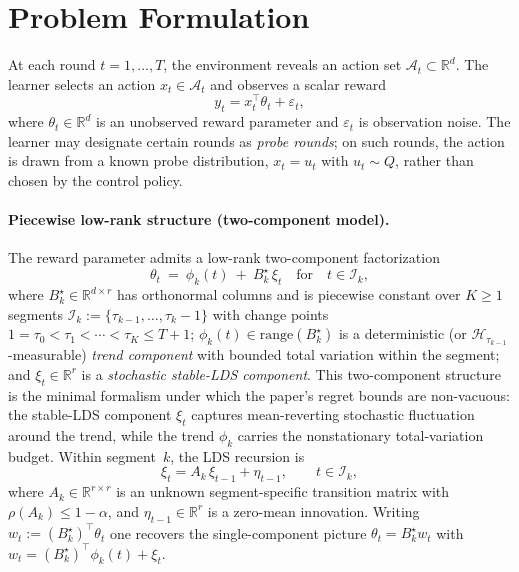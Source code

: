 \documentclass[11pt]{article}
\newcommand{\R}{\mathbb{R}}
\newcommand{\cA}{\mathcal{A}}
\newcommand{\cH}{\mathcal{H}}
\newcommand{\cI}{\mathcal{I}}
\newcommand{\range}{\mathrm{range}}
\begin{document}
\section{Problem Formulation}
\label{sec:formulation}

At each round $t=1,\ldots,T$, the environment reveals an action set
$\cA_t\subset\R^d$.
The learner selects an action $x_t\in\cA_t$ and observes a scalar reward
\begin{equation}
  y_t = x_t^\top\theta_t + \varepsilon_t,
  \label{eq:reward}
\end{equation}
where $\theta_t\in\R^d$ is an unobserved reward parameter and $\varepsilon_t$ is
observation noise.
The learner may designate certain rounds as \emph{probe rounds}; on such rounds,
the action is drawn from a known probe distribution, $x_t = u_t$ with $u_t\sim Q$,
rather than chosen by the control policy.

\paragraph{Piecewise low-rank structure (two-component model).}
The reward parameter admits a low-rank two-component factorization
\begin{equation}
  \theta_t \ =\ \phi_k(t)\ +\ B_k^\star\,\xi_t \quad\text{for}\quad t\in\cI_k,
  \label{eq:two_component}
\end{equation}
where $B_k^\star\in\R^{d\times r}$ has orthonormal columns and is piecewise constant
over $K\ge 1$ segments $\cI_k:=\{\tau_{k-1},\ldots,\tau_k-1\}$ with change points
$1=\tau_0<\tau_1<\cdots<\tau_K\le T+1$; $\phi_k(t)\in\range(B_k^\star)$ is a
deterministic (or $\cH_{\tau_{k-1}}$-measurable) \emph{trend component} with
bounded total variation within the segment; and $\xi_t\in\R^r$ is a \emph{stochastic
stable-LDS component}.  This two-component structure is the minimal formalism
under which the paper's regret bounds are non-vacuous: the stable-LDS component
$\xi_t$ captures mean-reverting stochastic fluctuation around the trend, while
the trend $\phi_k$ carries the nonstationary total-variation budget.
Within segment~$k$, the LDS recursion is
\begin{equation}
  \xi_t = A_k\,\xi_{t-1} + \eta_{t-1},\qquad t\in\cI_k,
  \label{eq:lds}
\end{equation}
where $A_k\in\R^{r\times r}$ is an unknown segment-specific transition matrix with
$\rho(A_k)\le 1-\alpha$, and $\eta_{t-1}\in\R^r$ is a zero-mean innovation.
Writing $w_t:=(B_k^\star)^\top\theta_t$ one recovers the single-component picture
$\theta_t=B_k^\star w_t$ with $w_t=(B_k^\star)^\top\phi_k(t)+\xi_t$.
\end{document}
